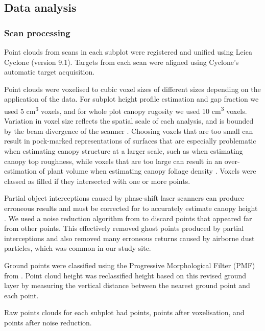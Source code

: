 \documentclass[11pt,a4paper]{article}
\newcommand{\textapprox}{\raisebox{0.5ex}{\texttildelow}}  %
\begin{document}
\subsection{Data analysis}

\subsubsection{Scan processing}

Point clouds from scans in each subplot were registered and unified using Leica Cyclone (version 9.1). Targets from each scan were aligned using Cyclone's automatic target acquisition. 

Point clouds were voxelised to cubic voxel sizes of different sizes depending on the application of the data. For subplot height profile estimation and gap fraction we used 5 cm\textsuperscript{3} voxels, and for whole plot canopy rugosity we used 10 cm\textsuperscript{3} voxels. Variation in voxel size reflects the spatial scale of each analysis, and is bounded by the beam divergence of the scanner \citep{}. Choosing voxels that are too small can result in pock-marked representations of surfaces that are especially problematic when estimating canopy structure at a larger scale, such as when estimating canopy top roughness, while voxels that are too large can result in an over-estimation of plant volume when estimating canopy foliage density \citep{Cifuentes2014}. Voxels were classed as filled if they intersected with one or more points.

Partial object interceptions caused by phase-shift laser scanners can produce erroneous results and must be corrected for to accurately estimate canopy height \citep{}. We used a noise reduction algorithm from \citet{} to discard points that appeared far from other points. This effectively removed ghost points produced by partial interceptions and also removed many erroneous returns caused by airborne dust particles, which was common in our study site.

Ground points were classified using the Progressive Morphological Filter (PMF) from \citet{Zhang2003}. Point cloud height was reclassified height based on this revised ground layer by measuring the vertical distance between the nearest ground point and each point.

Raw points clouds for each subplot had \textapprox{}\rawpt{} points, \textapprox{}\voxelpt{} points after voxelisation, and \textapprox{}\subpt{} points after noise reduction.
\end{document}
